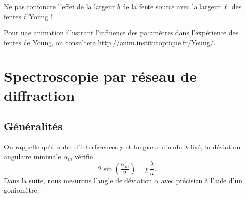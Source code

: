 \begin{danger}
Ne pas confondre l’effet de la largeur $b$ de la fente source avec la largeur $\ell$ des fentes d’Young !
\end{danger}
%
%
%
%
%

Pour une animation illustrant l’influence des paramètres dans l’expérience des fentes
de Young, on consultera
 \href{http://anim.institutoptique.fr/Young/}{http://anim.institutoptique.fr/Young/}.



\section{Spectroscopie par réseau de diffraction\bonus}

\subsection{Généralités}
\begin{quest}
\end{quest}
On rappelle qu’à ordre d’interférences $p$ et longueur d’onde $\lambda$ fixé, la déviation angulaire minimale $\alpha_m$ vérifie 
\begin{equation}\label{eq:2sin}
2\sin\left(\frac{\alpha_m}{2}\right) = p \,\frac{ \lambda}{a}.
\end{equation} 
Dans la suite, nous mesurons l’angle de déviation $\alpha$ avec précision à l’aide d’un goniomètre.

